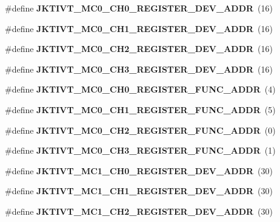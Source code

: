 \begin{DoxyCompactItemize}
\mbox{\label{types_8h_a7ec9fcd9e4c9625ba4a1f10c91ec6586}} 
\#define {\bfseries J\+K\+T\+I\+V\+T\+\_\+\+M\+C0\+\_\+\+C\+H0\+\_\+\+R\+E\+G\+I\+S\+T\+E\+R\+\_\+\+D\+E\+V\+\_\+\+A\+D\+DR}~(16)
\item 
\mbox{\label{types_8h_a6290255155244c1f6a1613b223e93948}} 
\#define {\bfseries J\+K\+T\+I\+V\+T\+\_\+\+M\+C0\+\_\+\+C\+H1\+\_\+\+R\+E\+G\+I\+S\+T\+E\+R\+\_\+\+D\+E\+V\+\_\+\+A\+D\+DR}~(16)
\item 
\mbox{\label{types_8h_a8850e2fcc2ffe596f04a164ca3207cea}} 
\#define {\bfseries J\+K\+T\+I\+V\+T\+\_\+\+M\+C0\+\_\+\+C\+H2\+\_\+\+R\+E\+G\+I\+S\+T\+E\+R\+\_\+\+D\+E\+V\+\_\+\+A\+D\+DR}~(16)
\item 
\mbox{\label{types_8h_a7ef1d592aa43da255e0faa532f506af1}} 
\#define {\bfseries J\+K\+T\+I\+V\+T\+\_\+\+M\+C0\+\_\+\+C\+H3\+\_\+\+R\+E\+G\+I\+S\+T\+E\+R\+\_\+\+D\+E\+V\+\_\+\+A\+D\+DR}~(16)
\item 
\mbox{\label{types_8h_a34a91902211f34228e7295b2f5a8434f}} 
\#define {\bfseries J\+K\+T\+I\+V\+T\+\_\+\+M\+C0\+\_\+\+C\+H0\+\_\+\+R\+E\+G\+I\+S\+T\+E\+R\+\_\+\+F\+U\+N\+C\+\_\+\+A\+D\+DR}~(4)
\item 
\mbox{\label{types_8h_a30a607d052dd9925ea7fc5c2b1782298}} 
\#define {\bfseries J\+K\+T\+I\+V\+T\+\_\+\+M\+C0\+\_\+\+C\+H1\+\_\+\+R\+E\+G\+I\+S\+T\+E\+R\+\_\+\+F\+U\+N\+C\+\_\+\+A\+D\+DR}~(5)
\item 
\mbox{\label{types_8h_a91b1ef7fb933a2d9892afed9875761bf}} 
\#define {\bfseries J\+K\+T\+I\+V\+T\+\_\+\+M\+C0\+\_\+\+C\+H2\+\_\+\+R\+E\+G\+I\+S\+T\+E\+R\+\_\+\+F\+U\+N\+C\+\_\+\+A\+D\+DR}~(0)
\item 
\mbox{\label{types_8h_a1ef7141e216b11f2631a8ac995a34236}} 
\#define {\bfseries J\+K\+T\+I\+V\+T\+\_\+\+M\+C0\+\_\+\+C\+H3\+\_\+\+R\+E\+G\+I\+S\+T\+E\+R\+\_\+\+F\+U\+N\+C\+\_\+\+A\+D\+DR}~(1)
\item 
\mbox{\label{types_8h_af559def4c09229197e66cf5960f1aa02}} 
\#define {\bfseries J\+K\+T\+I\+V\+T\+\_\+\+M\+C1\+\_\+\+C\+H0\+\_\+\+R\+E\+G\+I\+S\+T\+E\+R\+\_\+\+D\+E\+V\+\_\+\+A\+D\+DR}~(30)
\item 
\mbox{\label{types_8h_a4fc17fd8b24d3435e67d64038f4362a3}} 
\#define {\bfseries J\+K\+T\+I\+V\+T\+\_\+\+M\+C1\+\_\+\+C\+H1\+\_\+\+R\+E\+G\+I\+S\+T\+E\+R\+\_\+\+D\+E\+V\+\_\+\+A\+D\+DR}~(30)
\item 
\mbox{\label{types_8h_a6abd14f082080e93b497faea32db10a4}} 
\#define {\bfseries J\+K\+T\+I\+V\+T\+\_\+\+M\+C1\+\_\+\+C\+H2\+\_\+\+R\+E\+G\+I\+S\+T\+E\+R\+\_\+\+D\+E\+V\+\_\+\+A\+D\+DR}~(30)
\item 

\end{DoxyCompactItemize}
